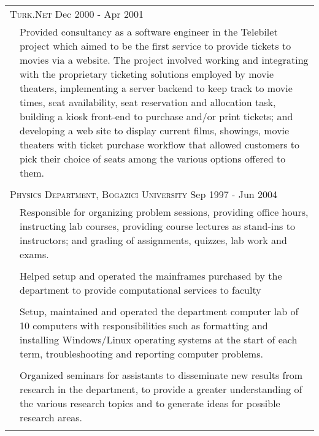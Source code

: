 \documentclass[a4paper,10pt]{article}
\newcommand{\exptitle}[2]{
  \multicolumn{2}{l}{\textsc{#1} \footnotesize{#2}} \\
  \specialrule{.01em}{0.5em}{1em}
}
\begin{document}
\begin{longtable}{r|p{11cm}}
  \exptitle{Turk.Net}{Dec 2000 - Apr 2001}

                                & Provided consultancy as a software engineer in the Telebilet project which aimed to be the first service to provide tickets to movies via a website. The project involved working and integrating with the proprietary ticketing solutions employed by movie theaters, implementing a server backend to keep track to movie times, seat availability, seat reservation and allocation task, building a kiosk front-end to purchase and/or print tickets; and developing a web site to display current films, showings, movie theaters with ticket purchase workflow that allowed customers to pick their choice of seats among the various options offered to them. \\
  \multicolumn{2}{c}{} \\



  \exptitle{Physics Department, Bogazici University}{Sep 1997 - Jun 2004}


                                & Responsible for organizing problem sessions, providing office hours, instructing lab courses, providing course lectures as stand-ins to instructors; and grading of assignments, quizzes, lab work and exams. \\
  \multicolumn{2}{c}{} \\

                                & Helped setup and operated the mainframes purchased by the department to provide computational services to faculty \\
  \multicolumn{2}{c}{} \\
                                & Setup, maintained and operated the department computer lab of 10 computers with responsibilities such as formatting and installing Windows/Linux operating systems at the start of each term, troubleshooting and reporting computer problems. \\
  \multicolumn{2}{c}{} \\
                                & Organized seminars for assistants to disseminate new results from research in the department, to provide a greater understanding of the various research topics and to generate ideas for possible research areas. \\
  \multicolumn{2}{c}{} \\


\end{longtable}

\end{document}
